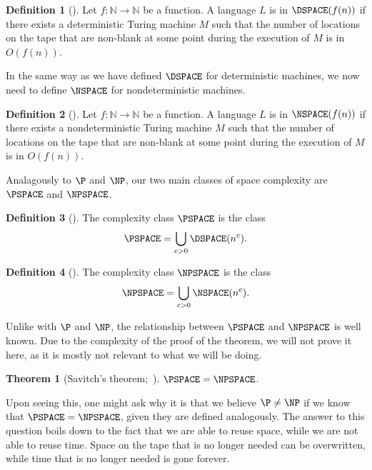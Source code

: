 \documentclass[english,12pt]{reedthesis}
\theoremstyle{plain}
\newtheorem{thm}{Theorem}[section]
\theoremstyle{definition}
\newtheorem{defn}[defn]{Definition}
\theoremstyle{remark}
\begin{document}
\begin{defn}[{\cite[Def.\ 4.1]{AB09}}]\label{def:dspace}
  Let $f: \mathbb{N} \rightarrow \mathbb{N}$ be a function. A language $L$ is in $\DSPACE(f(n))$ if there
  exists a deterministic Turing machine $M$ such that the number of locations on
  the tape that are non-blank at some point during the execution of $M$ is
  in $O(f(n))$.
\end{defn}

In the same way as we have defined $\DSPACE$ for deterministic machines, we now
need to define $\NSPACE$ for nondeterministic machines.

\begin{defn}[{\cite[Def. 4.1]{AB09}}]\label{def:nspace}
  Let $f: \mathbb{N} \rightarrow \mathbb{N}$ be a function. A language $L$ is in $\NSPACE(f(n))$ if there
  exists a nondeterministic Turing machine $M$ such that the number of locations
  on the tape that are non-blank at some point during the execution of $M$ is in
  $O(f(n))$.
\end{defn}

Analagously to $\P$ and $\NP$, our two main classes of space complexity are
$\PSPACE$ and $\NPSPACE$.

\begin{defn}[{\cite[Def.\ 4.5]{AB09}}]\label{def:pspace}
  The complexity class $\PSPACE$ is the class
  \[
    \PSPACE = \bigcup_{c > 0}\DSPACE(n^{c}).
  \]
\end{defn}

\begin{defn}[{\cite[Def.\ 4.5]{AB09}}]\label{def:npspace}
  The complexity class $\NPSPACE$ is the class
  \[
    \NPSPACE = \bigcup_{c > 0}\NSPACE(n^{c}).
  \]
\end{defn}

Unlike with $\P$ and $\NP$, the relationship between $\PSPACE$ and $\NPSPACE$ is
well known. Due to the complexity of the proof of the theorem, we will not prove
it here, as it is mostly not relevant to what we will be doing.

\begin{thm}[{Savitch's theorem;~\cite{Sav70}}]\label{thm:savitch}
  $\PSPACE = \NPSPACE$.
\end{thm}

Upon seeing this, one might ask why it is that we believe $\P \ne \NP$ if we know
that $\PSPACE = \NPSPACE$, given they are defined analogously. The answer to
this question boils down to the fact that we are able to reuse space, while we
are not able to reuse time. Space on the tape that is no longer needed can be
overwritten, while time that is no longer needed is gone forever.
\end{document}

